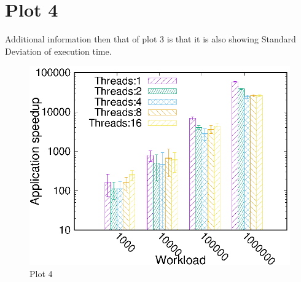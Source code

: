 \documentclass{article}
\begin{document}
\section{Plot 4}
Additional information then that of plot 3 is that it is also showing Standard Deviation of execution time.
\begin{figure}[htb!]
\centering
\includegraphics[scale=0.9]{plot4.eps}
\caption{Plot 4}
\end{figure}
\end{document}
